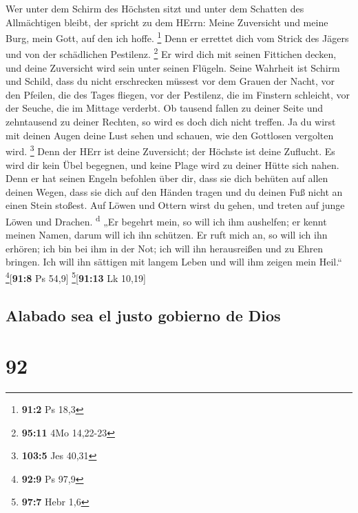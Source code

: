  Wer unter dem Schirm des Höchsten sitzt und unter dem
Schatten des Allmächtigen bleibt,  der spricht zu dem
HErrn: Meine Zuversicht und meine Burg, mein Gott, auf den ich hoffe.
\footnote{\textbf{91:2} Ps 18,3}  Denn er errettet dich
vom Strick des Jägers und von der schädlichen Pestilenz. \footnote{\textbf{95:11}
  4Mo 14,22-23}  Er wird dich mit seinen Fittichen decken,
und deine Zuversicht wird sein unter seinen Flügeln. Seine Wahrheit ist
Schirm und Schild,  dass du nicht erschrecken müssest vor
dem Grauen der Nacht, vor den Pfeilen, die des Tages fliegen,
 vor der Pestilenz, die im Finstern schleicht, vor der
Seuche, die im Mittage verderbt.  Ob tausend fallen zu
deiner Seite und zehntausend zu deiner Rechten, so wird es doch dich
nicht treffen.  Ja du wirst mit deinen Augen deine Lust
sehen und schauen, wie den Gottlosen vergolten wird. \footnote{\textbf{103:5}
  Jes 40,31}  Denn der HErr ist deine Zuversicht; der
Höchste ist deine Zuflucht.  Es wird dir kein Übel
begegnen, und keine Plage wird zu deiner Hütte sich nahen.
 Denn er hat seinen Engeln befohlen über dir, dass sie
dich behüten auf allen deinen Wegen,  dass sie dich auf
den Händen tragen und du deinen Fuß nicht an einen Stein stoßest.
 Auf Löwen und Ottern wirst du gehen, und treten auf
junge Löwen und Drachen. \textsuperscript{d}  „Er begehrt
mein, so will ich ihm aushelfen; er kennt meinen Namen, darum will ich
ihn schützen.  Er ruft mich an, so will ich ihn erhören;
ich bin bei ihm in der Not; ich will ihn herausreißen und zu Ehren
bringen.  Ich will ihn sättigen mit langem Leben und will
ihm zeigen mein Heil.`` \footnote{\textbf{92:9} Ps 97,9}{[}\textbf{91:8}
Ps 54,9{]} \footnote{\textbf{97:7} Hebr 1,6}{[}\textbf{91:13} Lk
10,19{]}

\hypertarget{alabado-sea-el-justo-gobierno-de-dios}{%
\subsection{Alabado sea el justo gobierno de
Dios}\label{alabado-sea-el-justo-gobierno-de-dios}}

\hypertarget{section-91}{%
\section{92}\label{section-91}}

